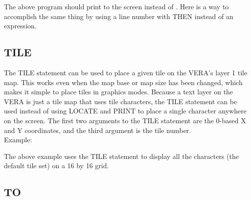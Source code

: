 The above program should print {} to the screen instead of
{}.  Here is a way to accomplish the same thing by using a line
number with {\ttfamily THEN} instead of an expression.\\


\subsection{TILE}

The {\ttfamily TILE} statement can be used to place a given tile on the VERA's
layer 1 tile map.  This works even when the map base or map size has been
changed, which makes it simple to place tiles in graphics modes.  Because a
text layer on the VERA is just a tile map that uses tile characters, the
{\ttfamily TILE} statement can be used instead of using {\ttfamily LOCATE} and
{\ttfamily PRINT} to place a single character anywhere on the screen.  The
first two arguments to the {\ttfamily TILE} statement are the 0-based X and Y
coordinates, and the third argument is the tile number.\\

Example:\\


The above example uses the {\ttfamily TILE} statement to display all the
characters (the default tile set) on a 16 by 16 grid.\\

\subsection{TO}

